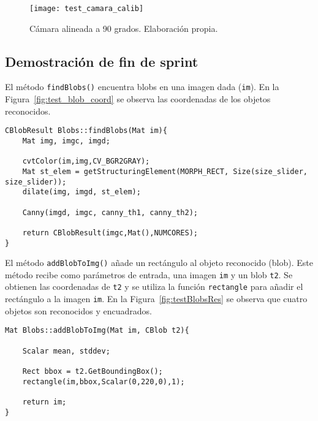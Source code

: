 \begin{figure}
  \centering
    \texttt{[image: test\_camara\_calib]}
  \caption{Cámara alineada a 90 grados. Elaboración propia.}
  \label{fig:test_camara_calib}
\end{figure}

\subsection{Demostración de fin de sprint}
 
El método \texttt{findBlobs()} encuentra blobs en una imagen dada (\texttt{im}). En la Figura~\ref{fig:test_blob_coord} se observa las coordenadas de los objetos reconocidos.

\begin{lstlisting}[label=findBlobs,caption=Método para encontrar blobs en una imagen]
CBlobResult Blobs::findBlobs(Mat im){
    Mat img, imgc, imgd;

    cvtColor(im,img,CV_BGR2GRAY);
    Mat st_elem = getStructuringElement(MORPH_RECT, Size(size_slider, size_slider));
    dilate(img, imgd, st_elem);

    Canny(imgd, imgc, canny_th1, canny_th2);

    return CBlobResult(imgc,Mat(),NUMCORES);
}
\end{lstlisting}


El método \texttt{addBlobToImg()} añade un rectángulo al objeto reconocido (blob). Este método recibe como parámetros de entrada, una imagen \texttt{im} y un blob \texttt{t2}. Se obtienen las coordenadas de \texttt{t2} y se utiliza la función \texttt{rectangle} para añadir el rectángulo a la imagen \texttt{im}. En la Figura~\ref{fig:testBlobsRes} se observa que cuatro objetos son reconocidos y encuadrados.


\begin{lstlisting}[label=addBlobToImg,caption=Método para añadir rectangulos a blobs]
Mat Blobs::addBlobToImg(Mat im, CBlob t2){

    Scalar mean, stddev;
        
    Rect bbox = t2.GetBoundingBox();
    rectangle(im,bbox,Scalar(0,220,0),1);
    
    return im;
}

\end{lstlisting}


